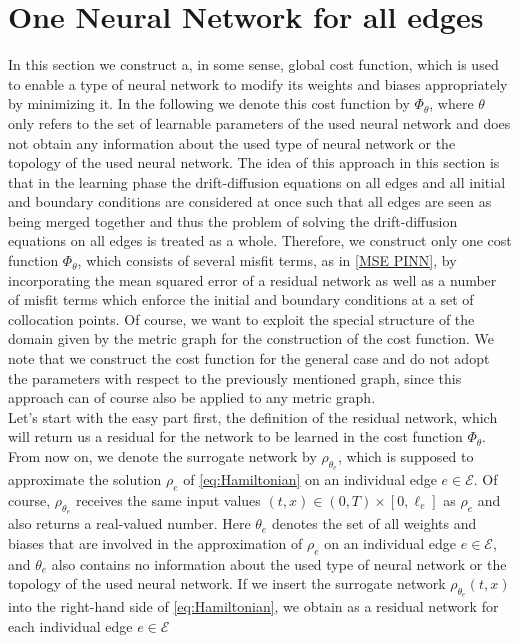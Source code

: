 \section{One Neural Network for all edges}
\label{ch3:sec1}

In this section we construct a, in some sense, global cost function, which is used to enable a type of neural network to modify its weights and biases appropriately by minimizing it. In the following we denote this cost function by $\Phi_\theta$, where $\theta$ only refers to the set of learnable parameters of the used neural network and does not obtain any information about the used type of neural network or the topology of the used neural network. The idea of this approach in this section is that in the learning phase the drift-diffusion equations on all edges and all initial and boundary conditions are considered at once such that all edges are seen as being merged together and thus the problem of solving the drift-diffusion equations on all edges is treated as a whole. Therefore, we construct only one cost function $\Phi_\theta$, which consists of several misfit terms, as in \cref{MSE PINN}, by incorporating the mean squared error of a residual network as well as a number of misfit terms which enforce the initial and boundary conditions at a set of collocation points. Of course, we want to exploit the special structure of the domain given by the metric graph for the construction of the cost function. We note that we construct the cost function for the general case and do not adopt the parameters with respect to the previously mentioned graph, since this approach can of course also be applied to any metric graph. \\
Let's start with the easy part first, the definition of the residual network, which will return us a residual for the network to be learned in the cost function $\Phi_\theta$. From now on, we denote the surrogate network by $\rho_{\theta_e}$, which is supposed to approximate the solution $\rho_e$ of \cref{eq:Hamiltonian} on an individual edge $e \in \mathcal{E}$. Of course, $\rho_{\theta_e}$ receives the same input values $ \left( t, x \right) \in  \left( 0, T \right) \times [0, \ell_e]$ as $\rho_e$ and also returns a real-valued number. Here $\theta_e$ denotes the set of all weights and biases that are involved in the approximation of $\rho_e$ on an individual edge $e \in \mathcal{E}$, and $\theta_e$ also contains no information about the used type of neural network or the topology of the used neural network. If we insert the surrogate network $\rho_{\theta_e} \left( t,x \right)$ into the right-hand side of \cref{eq:Hamiltonian}, we obtain as a residual network for each individual edge $e \in \mathcal{E}$

